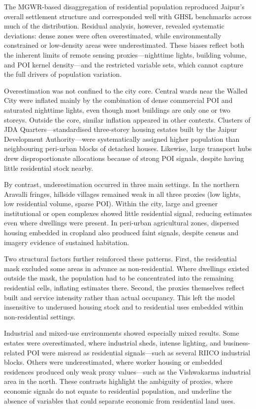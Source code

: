 \documentclass[
  12pt,
  oneside]{book}
\begin{document}
The MGWR-based disaggregation of residential population reproduced Jaipur's overall settlement structure and corresponded well with GHSL benchmarks across much of the distribution. Residual analysis, however, revealed systematic deviations: dense zones were often overestimated, while environmentally constrained or low-density areas were underestimated. These biases reflect both the inherent limits of remote sensing proxies---nighttime lights, building volume, and POI kernel density---and the restricted variable sets, which cannot capture the full drivers of population variation.

Overestimation was not confined to the city core. Central wards near the Walled City were inflated mainly by the combination of dense commercial POI and saturated nighttime lights, even though most buildings are only one or two storeys. Outside the core, similar inflation appeared in other contexts. Clusters of JDA Quarters---standardised three-storey housing estates built by the Jaipur Development Authority---were systematically assigned higher population than neighbouring peri-urban blocks of detached houses. Likewise, large transport hubs drew disproportionate allocations because of strong POI signals, despite having little residential stock nearby.

By contrast, underestimation occurred in three main settings. In the northern Aravalli fringes, hillside villages remained weak in all three proxies (low lights, low residential volume, sparse POI). Within the city, large and greener institutional or open complexes showed little residential signal, reducing estimates even where dwellings were present. In peri-urban agricultural zones, dispersed housing embedded in cropland also produced faint signals, despite census and imagery evidence of sustained habitation.

Two structural factors further reinforced these patterns. First, the residential mask excluded some areas in advance as non-residential. Where dwellings existed outside the mask, the population had to be concentrated into the remaining residential cells, inflating estimates there. Second, the proxies themselves reflect built and service intensity rather than actual occupancy. This left the model insensitive to underused housing stock and to residential uses embedded within non-residential settings.

Industrial and mixed-use environments showed especially mixed results. Some estates were overestimated, where industrial sheds, intense lighting, and business-related POI were misread as residential signals---such as several RIICO industrial blocks. Others were underestimated, where worker housing or embedded residences produced only weak proxy values---such as the Vishwakarma industrial area in the north. These contrasts highlight the ambiguity of proxies, where economic signals do not equate to residential population, and underline the absence of variables that could separate economic from residential land uses.
\end{document}
